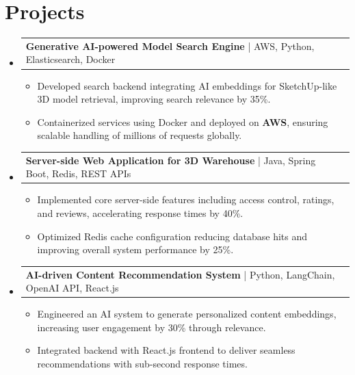 \documentclass[letterpaper,11pt]{article}
\makeatletter
\newcommand{\resumeItem}[1]{
  \item\footnotesize{
    {#1 \vspace{-2pt}}
  }
}
\newcommand{\resumeProjectHeading}[2]{
    \item
    \begin{tabular*}{1.001\textwidth}{l@{\extracolsep{\fill}}r}
      \small#1 & \textbf{\small #2}\\
    \end{tabular*}\vspace{-7pt}
}
\newcommand{\resumeSubHeadingListStart}{\begin{itemize}[leftmargin=0pt, label={}]}
\newcommand{\resumeSubHeadingListEnd}{\end{itemize}}
\newcommand{\resumeItemListStart}{\begin{itemize}[leftmargin=*]}
\newcommand{\resumeItemListEnd}{\end{itemize}\vspace{-5pt}}
\makeatother
\begin{document}
\section{Projects}
    \vspace{-5pt}
    \resumeSubHeadingListStart
      \resumeProjectHeading
          {\textbf{Generative AI-powered Model Search Engine} | AWS, Python, Elasticsearch, Docker}{}
          \resumeItemListStart
              \resumeItem{Developed search backend integrating AI embeddings for SketchUp-like 3D model retrieval, improving search relevance by 35\%.}
              \resumeItem{Containerized services using Docker and deployed on \textbf{AWS}, ensuring scalable handling of millions of requests globally.}
          \resumeItemListEnd
          \vspace{-12pt}
      \resumeProjectHeading
          {\textbf{Server-side Web Application for 3D Warehouse} | Java, Spring Boot, Redis, REST APIs}{}
          \resumeItemListStart
              \resumeItem{Implemented core server-side features including access control, ratings, and reviews, accelerating response times by 40\%.}
              \resumeItem{Optimized Redis cache configuration reducing database hits and improving overall system performance by 25\%.}
          \resumeItemListEnd
          \vspace{-12pt}
      \resumeProjectHeading
          {\textbf{AI-driven Content Recommendation System} | Python, LangChain, OpenAI API, React.js}{}
          \resumeItemListStart
              \resumeItem{Engineered an AI system to generate personalized content embeddings, increasing user engagement by 30\% through relevance.}
              \resumeItem{Integrated backend with React.js frontend to deliver seamless recommendations with sub-second response times.}
          \resumeItemListEnd 
    \resumeSubHeadingListEnd
\end{document}
